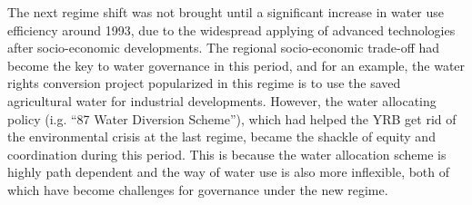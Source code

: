 \documentclass[9pt, twocolumn, twoside, lineno]{pnas-new}
\begin{document}
The next regime shift was not brought until a significant increase in water use efficiency around 1993, due to the widespread applying of advanced technologies after socio-economic developments. 
The regional socio-economic trade-off had become the key to water governance in this period, and for an example, the water rights conversion project popularized in this regime is to use the saved agricultural water for industrial developments.
However, the water allocating policy (i.g. ``87 Water Diversion Scheme''), which had helped the YRB get rid of the environmental crisis at the last regime, became the shackle of equity and coordination during this period.
This is because the water allocation scheme is highly path dependent and the way of water use is also more inflexible, both of which have become challenges for governance under the new regime.
\end{document}
